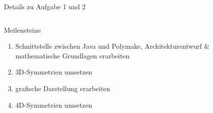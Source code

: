 \documentclass[ucs,11pt]{beamer}
\begin{document}
\begin{frame}{Details zu Aufgabe 1 und 2}
\begin{columns}
\begin{column}{.48\textwidth}
{}
\end{column}%
\end{columns}	
\end{frame}

\begin{frame}{Meilensteine}
	\begin{enumerate}
		\item Schnittstelle zwischen Java und Polymake, Architekturentwurf \& mathematische Grundlagen erarbeiten 
		\item 3D-Symmetrien umsetzen
		\item grafische Darstellung erarbeiten
		\item 4D-Symmetrien umsetzen
	\end{enumerate}
\end{frame}
\end{document}
